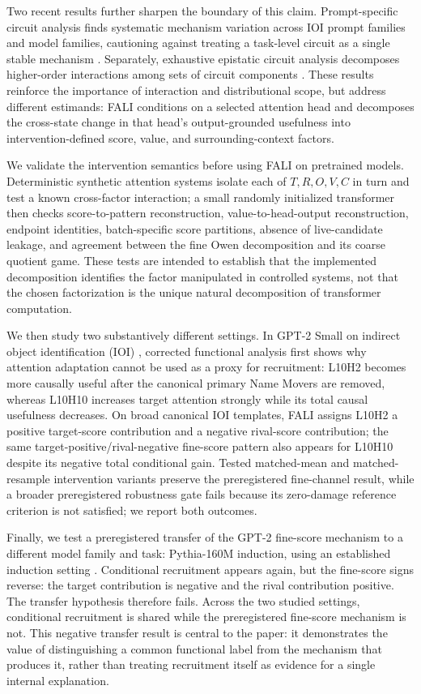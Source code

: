 \documentclass[pdflatex,sn-mathphys-ay]{sn-jnl}
\begin{document}
Two recent results further sharpen the boundary of this claim. Prompt-specific circuit analysis finds systematic mechanism variation across IOI prompt families and model families, cautioning against treating a task-level circuit as a single stable mechanism \citep{franco2026promptspecific}. Separately, exhaustive epistatic circuit analysis decomposes higher-order interactions among sets of circuit components \citep{tower2026epistatic}. These results reinforce the importance of interaction and distributional scope, but address different estimands: FALI conditions on a selected attention head and decomposes the cross-state change in that head's output-grounded usefulness into intervention-defined score, value, and surrounding-context factors.

We validate the intervention semantics before using FALI on pretrained models. Deterministic synthetic attention systems isolate each of $T,R,O,V,C$ in turn and test a known cross-factor interaction; a small randomly initialized transformer then checks score-to-pattern reconstruction, value-to-head-output reconstruction, endpoint identities, batch-specific score partitions, absence of live-candidate leakage, and agreement between the fine Owen decomposition and its coarse quotient game. These tests are intended to establish that the implemented decomposition identifies the factor manipulated in controlled systems, not that the chosen factorization is the unique natural decomposition of transformer computation.

We then study two substantively different settings. In GPT-2 Small on indirect object identification (IOI) \citep{wang2023ioi}, corrected functional analysis first shows why attention adaptation cannot be used as a proxy for recruitment: L10H2 becomes more causally useful after the canonical primary Name Movers are removed, whereas L10H10 increases target attention strongly while its total causal usefulness decreases. On broad canonical IOI templates, FALI assigns L10H2 a positive target-score contribution and a negative rival-score contribution; the same target-positive/rival-negative fine-score pattern also appears for L10H10 despite its negative total conditional gain. Tested matched-mean and matched-resample intervention variants preserve the preregistered fine-channel result, while a broader preregistered robustness gate fails because its zero-damage reference criterion is not satisfied; we report both outcomes.

Finally, we test a preregistered transfer of the GPT-2 fine-score mechanism to a different model family and task: Pythia-160M induction, using an established induction setting \citep{olsson2022induction}. Conditional recruitment appears again, but the fine-score signs reverse: the target contribution is negative and the rival contribution positive. The transfer hypothesis therefore fails. Across the two studied settings, conditional recruitment is shared while the preregistered fine-score mechanism is not. This negative transfer result is central to the paper: it demonstrates the value of distinguishing a common functional label from the mechanism that produces it, rather than treating recruitment itself as evidence for a single internal explanation.
\end{document}
